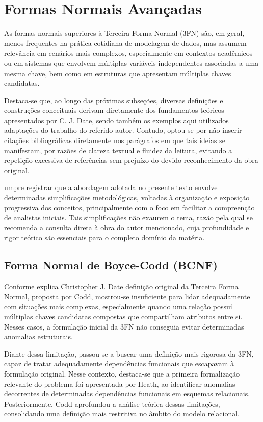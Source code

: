 \section{Formas Normais Avançadas}

As formas normais superiores à Terceira Forma Normal (3FN) são, em geral, menos frequentes na prática cotidiana de modelagem de dados, mas assumem relevância em cenários mais complexos, especialmente em contextos acadêmicos ou em sistemas que envolvem múltiplas variáveis independentes associadas a uma mesma chave, bem como em estruturas que apresentam múltiplas chaves candidatas.

Destaca-se que, ao longo das próximas subseções, diversas definições e construções conceituais derivam diretamente dos fundamentos teóricos apresentados por C. J. Date\cite{date2003introducao}, sendo também os exemplos aqui utilizados adaptações do trabalho do referido autor. Contudo, optou-se por não inserir citações bibliográficas diretamente nos parágrafos em que tais ideias se manifestam, por razões de clareza textual e fluidez da leitura, evitando a repetição excessiva de referências sem prejuízo do devido reconhecimento da obra original.

umpre registrar que a abordagem adotada no presente texto envolve determinadas simplificações metodológicas, voltadas à organização e exposição progressiva dos conceitos, principalmente com o foco em facilitar a compreenção de analistas iniciais. Tais simplificações não exaurem o tema, razão pela qual se recomenda a consulta direta à obra do autor mencionado, cuja profundidade e rigor teórico são essenciais para o completo domínio da matéria.

\subsection{Forma Normal de Boyce-Codd (BCNF)}
Conforme explica Christopher J. Date\cite{date2003introducao} definição original da Terceira Forma Normal, proposta por Codd, mostrou-se insuficiente para lidar adequadamente com situações mais complexas, especialmente quando uma relação possui múltiplas chaves candidatas compostas que compartilham atributos entre si. Nesses casos, a formulação inicial da 3FN não conseguia evitar determinadas anomalias estruturais.

Diante dessa limitação, passou-se a buscar uma definição mais rigorosa da 3FN, capaz de tratar adequadamente dependências funcionais que escapavam à formulação original. Nesse contexto, destaca-se que a primeira formalização relevante do problema foi apresentada por Heath\cite{heath1971unacceptable}, ao identificar anomalias decorrentes de determinadas dependências funcionais em esquemas relacionais. Posteriormente, Codd\cite{codd1972recent} aprofundou a análise teórica dessas limitações, consolidando uma definição mais restritiva no âmbito do modelo relacional.

